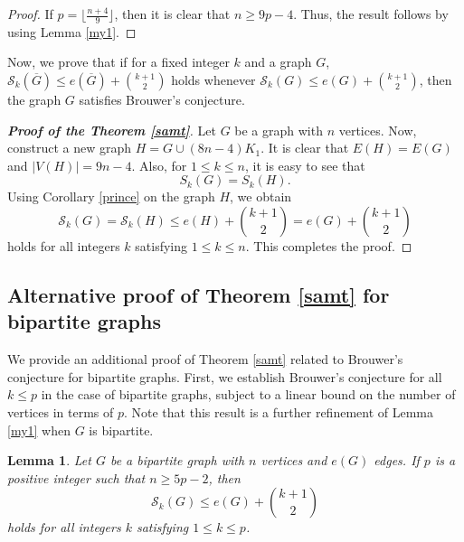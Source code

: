 \documentclass[12pt]{article}
\theoremstyle{plain}
\newtheorem{lemma}[theorem]{Lemma}
\theoremstyle{definition}
\begin{document}
\begin{proof}
If $p=\lfloor \frac{n+4} {9}\rfloor$, then it is clear that $n\geq 9p-4$.  Thus, the result follows by using Lemma \ref{my1}.
\end{proof}
Now, we prove that if for a fixed integer $k$ and a graph $G$, $\mathcal{S}_k(\overline{G})\leq e(\overline{G})+\binom{k+1}{2}$ holds whenever $\mathcal{S}_k(G)\leq e(G)+\binom{k+1}{2}$, then the graph $G$ satisfies Brouwer’s conjecture.
\begin{proof}[\bf Proof of the Theorem \ref{samt}]
Let $G$ be a graph with $n$ vertices. Now, construct a new graph $H=G\cup(8n-4)K_1$. It is clear that $E(H)=E(G)$ and $|V(H)|=9n-4$. Also,  for $1\leq k \leq n$, it is easy to see that $$S_k(G)=S_k(H).$$ Using Corollary \ref{prince} on the graph $H$, we obtain $$\mathcal{S}_k(G)=\mathcal{S}_k(H)\leq e(H)+\binom{k+1}{2}=e(G)+\binom{k+1}{2}$$ holds for all integers $k$ satisfying $1\leq k\leq n$. This completes the proof.
\end{proof}
\subsection{Alternative proof of Theorem \ref{samt} for bipartite graphs}
We provide an additional proof of Theorem \ref{samt} related to Brouwer's conjecture for bipartite graphs. First, we establish Brouwer’s conjecture for all $k\leq p$ in the case of bipartite graphs, subject to a linear bound on the number of vertices in terms of $p$. Note that this result is a further refinement of Lemma \ref{my1} when $G$ is bipartite.

\begin{lemma} \label{my2}
Let $G$ be a bipartite graph with $n$ vertices and $e(G)$ edges. If $p$ is a positive integer such that $n\geq 5p-2$, then $$\mathcal{S}_k(G)\leq e(G)+\binom{k+1}{2}$$ holds for all integers $k$ satisfying $1\leq k\leq p$.
\end{lemma}
\end{document}
